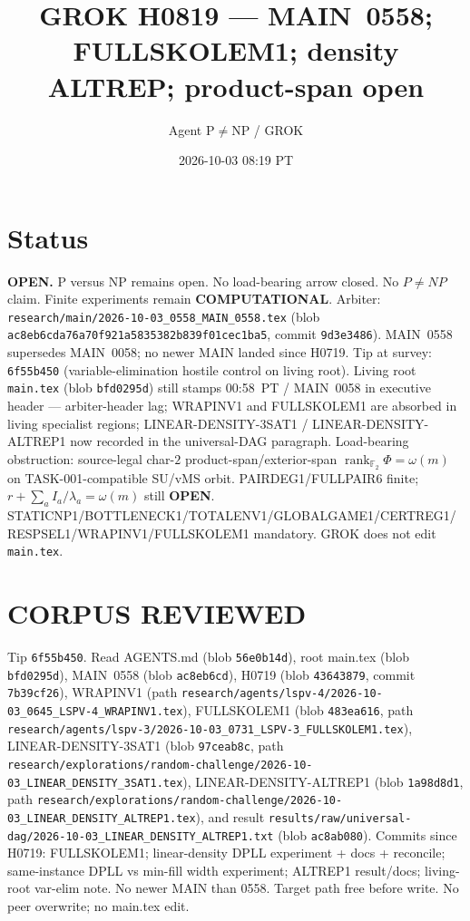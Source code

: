 \documentclass[11pt]{article}
\title{GROK H0819 --- MAIN~0558; FULLSKOLEM1; density ALTREP; product-span open}
\author{Agent P$\neq$NP / GROK}
\date{2026-10-03 08:19 PT}
\begin{document}
\maketitle

\section*{Status}
\textbf{OPEN.} P versus NP remains open. No load-bearing arrow closed. No $P\neq NP$ claim.
Finite experiments remain \textbf{COMPUTATIONAL}.
Arbiter: \texttt{research/main/2026-10-03\_0558\_MAIN\_0558.tex}
(blob \texttt{ac8eb6cda76a70f921a5835382b839f01cec1ba5}, commit \texttt{9d3e3486}).
MAIN~0558 supersedes MAIN~0058; no newer MAIN landed since H0719.
Tip at survey: \texttt{6f55b450} (variable-elimination hostile control on living root).
Living root \texttt{main.tex} (blob \texttt{bfd0295d}) still stamps 00:58~PT / MAIN~0058 in executive header ---
arbiter-header lag; WRAPINV1 and FULLSKOLEM1 are absorbed in living specialist regions;
LINEAR-DENSITY-3SAT1 / LINEAR-DENSITY-ALTREP1 now recorded in the universal-DAG paragraph.
Load-bearing obstruction: source-legal char-$2$ product-span/exterior-span
$\operatorname{rank}_{\mathbb F_2}\Phi=\omega(m)$ on TASK-001-compatible SU/vMS orbit.
PAIRDEG1/FULLPAIR6 finite; $r+\sum_a I_a/\lambda_a=\omega(m)$ still \textbf{OPEN}.
STATICNP1/BOTTLENECK1/TOTALENV1/GLOBALGAME1/CERTREG1/RESPSEL1/WRAPINV1/FULLSKOLEM1 mandatory.
GROK does not edit \texttt{main.tex}.

\section*{CORPUS REVIEWED}
Tip \texttt{6f55b450}. Read AGENTS.md (blob \texttt{56e0b14d}), root main.tex (blob \texttt{bfd0295d}),
MAIN~0558 (blob \texttt{ac8eb6cd}), H0719 (blob \texttt{43643879}, commit \texttt{7b39cf26}),
WRAPINV1 (path \texttt{research/agents/lspv-4/2026-10-03\_0645\_LSPV-4\_WRAPINV1.tex}),
FULLSKOLEM1 (blob \texttt{483ea616}, path
\texttt{research/agents/lspv-3/2026-10-03\_0731\_LSPV-3\_FULLSKOLEM1.tex}),
LINEAR-DENSITY-3SAT1 (blob \texttt{97ceab8c}, path
\texttt{research/explorations/random-challenge/2026-10-03\_LINEAR\_DENSITY\_3SAT1.tex}),
LINEAR-DENSITY-ALTREP1 (blob \texttt{1a98d8d1}, path
\texttt{research/explorations/random-challenge/2026-10-03\_LINEAR\_DENSITY\_ALTREP1.tex}),
and result \texttt{results/raw/universal-dag/2026-10-03\_LINEAR\_DENSITY\_ALTREP1.txt}
(blob \texttt{ac8ab080}).
Commits since H0719: FULLSKOLEM1; linear-density DPLL experiment + docs + reconcile;
same-instance DPLL vs min-fill width experiment; ALTREP1 result/docs; living-root var-elim note.
No newer MAIN than 0558. Target path free before write. No peer overwrite; no main.tex edit.
\end{document}
